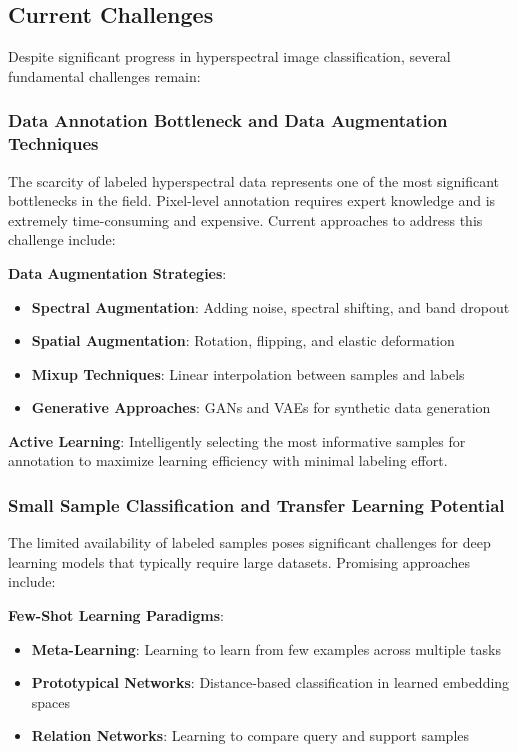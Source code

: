 \documentclass[journal]{IEEEtran}
\begin{document}
\subsection{Current Challenges}

Despite significant progress in hyperspectral image classification, several fundamental challenges remain:

\subsubsection{Data Annotation Bottleneck and Data Augmentation Techniques}

The scarcity of labeled hyperspectral data represents one of the most significant bottlenecks in the field. Pixel-level annotation requires expert knowledge and is extremely time-consuming and expensive. Current approaches to address this challenge include:

\textbf{Data Augmentation Strategies}:
\begin{itemize}
\item \textbf{Spectral Augmentation}: Adding noise, spectral shifting, and band dropout
\item \textbf{Spatial Augmentation}: Rotation, flipping, and elastic deformation
\item \textbf{Mixup Techniques}: Linear interpolation between samples and labels
\item \textbf{Generative Approaches}: GANs and VAEs for synthetic data generation
\end{itemize}

\textbf{Active Learning}: Intelligently selecting the most informative samples for annotation to maximize learning efficiency with minimal labeling effort.

\subsubsection{Small Sample Classification and Transfer Learning Potential}

The limited availability of labeled samples poses significant challenges for deep learning models that typically require large datasets. Promising approaches include:

\textbf{Few-Shot Learning Paradigms}:
\begin{itemize}
\item \textbf{Meta-Learning}: Learning to learn from few examples across multiple tasks
\item \textbf{Prototypical Networks}: Distance-based classification in learned embedding spaces
\item \textbf{Relation Networks}: Learning to compare query and support samples
\end{itemize}
\end{document}
